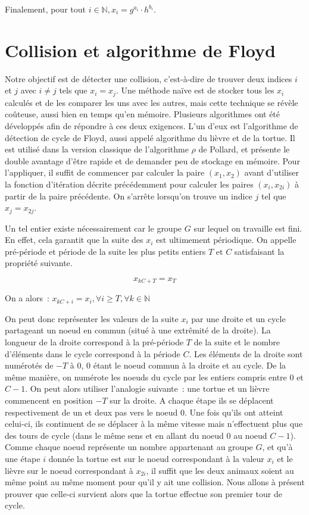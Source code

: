         Finalement, pour tout $i \in \mathbb{N}, x_i = g^{a_i} \cdot h^{b_i}$.

        \section{Collision et algorithme de Floyd}
        \label{chapter1:Floyd}
        Notre objectif est de détecter une collision, c'est-à-dire de trouver deux indices $i$ et $j$ avec $i \ne j$ tels que $x_i = x_j$. Une méthode naïve est de stocker tous les $x_i$ calculés et de les comparer les uns avec les autres, mais cette technique se révèle coûteuse, aussi bien en temps qu'en mémoire. Plusieurs algorithmes ont été développés afin de répondre à ces deux exigences. L'un d'eux est l'algorithme de détection de cycle de Floyd, aussi appelé algorithme du lièvre et de la tortue. Il est utilisé dans la version classique de l'algorithme \texorpdfstring{$\rho$}{Rho} de Pollard, et présente le double avantage d'être rapide et de demander peu de stockage en mémoire. Pour l'appliquer, il suffit de commencer par calculer la paire $(x_1, x_2)$ avant d'utiliser la fonction d'itération décrite précédemment pour calculer les paires $(x_i, x_{2i})$ à partir de la paire précédente. On s'arrête lorsqu'on trouve un indice $j$ tel que $x_j = x_{2j}$.

        Un tel entier existe nécessairement car le groupe $G$ sur lequel on travaille est fini. En effet, cela garantit que la suite des $x_i$ est ultimement périodique. On appelle pré-période et période de la suite les plus petits entiers $T$ et $C$ satisfaisant la propriété suivante.

        \[ x_{kC+T} = x_T \]

        On a alors~: $ x_{kC+i} = x_i, \forall i \ge T, \forall k \in \mathbb{N}$

        On peut donc représenter les valeurs de la suite $x_i$ par une droite et un cycle partageant un noeud en commun (situé à une extrêmité de la droite). La longueur de la droite correspond à la pré-période $T$ de la suite et le nombre d'éléments dans le cycle correspond à la période $C$. Les éléments de la droite sont numérotés de $-T$ à $0$, $0$ étant le noeud commun à la droite et au cycle. De la même manière, on numérote les noeuds du cycle par les entiers compris entre $0$ et $C-1$. On peut alors utiliser l'analogie suivante~: une tortue et un lièvre commencent en position $-T$ sur la droite. A chaque étape ils se déplacent respectivement de un et deux pas vers le noeud $0$. Une fois qu'ils ont atteint celui-ci, ils continuent de se déplacer à la même vitesse mais n'effectuent plus que des tours de cycle (dans le même sens et en allant du noeud $0$ au noeud $C-1$). Comme chaque noeud représente un nombre appartenant au groupe $G$, et qu'à une étape $i$ donnée la tortue est sur le noeud correspondant à la valeur $x_i$ et le lièvre sur le noeud correspondant à $x_{2i}$, il suffit que les deux animaux soient au même point au même moment pour qu'il y ait une collision. Nous allons à présent prouver que celle-ci survient alors que la tortue effectue son premier tour de cycle.

